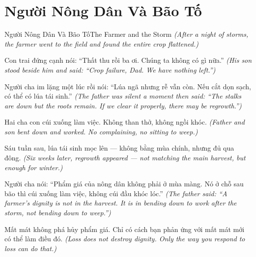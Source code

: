\section{Người Nông Dân Và Bão Tố}
\begin{truyen}{Người Nông Dân Và Bão Tố}{The Farmer and the Storm}
\textit{(After a night of storms, the farmer went to the field and found the entire crop flattened.)}

Con trai đứng cạnh nói: ``Thất thu rồi ba ơi. Chúng ta không có gì nữa.''
\textit{(His son stood beside him and said: ``Crop failure, Dad. We have nothing left.'')}

Người cha im lặng một lúc rồi nói: ``Lúa ngã nhưng rễ vẫn còn. Nếu cắt dọn sạch, có thể có lúa tái sinh.''
\textit{(The father was silent a moment then said: ``The stalks are down but the roots remain. If we clear it properly, there may be regrowth.'')}

Hai cha con cúi xuống làm việc. Không than thở, không ngồi khóc.
\textit{(Father and son bent down and worked. No complaining, no sitting to weep.)}

Sáu tuần sau, lúa tái sinh mọc lên — không bằng mùa chính, nhưng đủ qua đông.
\textit{(Six weeks later, regrowth appeared — not matching the main harvest, but enough for winter.)}

Người cha nói: ``Phẩm giá của nông dân không phải ở mùa màng. Nó ở chỗ sau bão thì cúi xuống làm việc, không cúi đầu khóc lóc.''
\textit{(The father said: ``A farmer's dignity is not in the harvest. It is in bending down to work after the storm, not bending down to weep.'')}

\end{truyen}

\begin{baihoc}
Mất mát không phá hủy phẩm giá. Chỉ có cách bạn phản ứng với mất mát mới có thể làm điều đó.
\textit{(Loss does not destroy dignity. Only the way you respond to loss can do that.)}
\end{baihoc}
